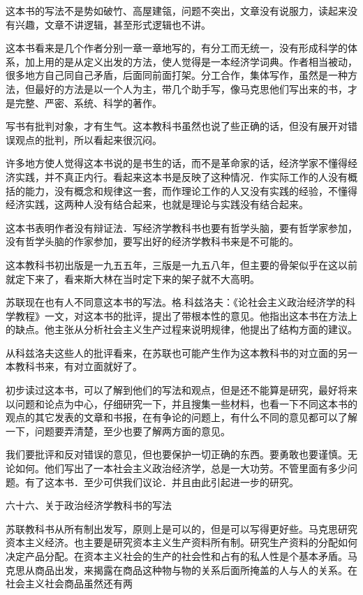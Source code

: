 这本书的写法不是势如破竹、高屋建瓴，问题不突出，文章没有说服力，读起来没有兴趣，文章不讲逻辑，甚至形式逻辑也不讲。

这本书看来是几个作者分别一章一章地写的，有分工而无统一，没有形成科学的体系，加上用的是从定义出发的方法，使人觉得是一本经济学词典。作者相当被动，很多地方自己同自己矛盾，后面同前面打架。分工合作，集体写作，虽然是一种方法，但最好的方法是以一个人为主，带几个助手写，像马克思他们写出来的书，才是完整、严密、系统、科学的著作。

写书有批判对象，才有生气。这本教科书虽然也说了些正确的话，但没有展开对错误观点的批判，所以看起来很沉闷。

许多地方使人觉得这本书说的是书生的话，而不是革命家的话，经济学家不懂得经济实践，并不真正内行。看起来这本书是反映了这种情况．作实际工作的人没有概括的能力，没有概念和规律这一套，而作理论工作的人又没有实践的经验，不懂得经济实践，这两种人没有结合起来，也就是理论与实践没有结合起来。

这本书表明作者没有辩证法．写经济学教科书也要有哲学头脑，要有哲学家参加，没有哲学头脑的作家参加，要写出好的经济学教科书来是不可能的。

这本教科书初出版是一九五五年，三版是一九五八年，但主要的骨架似乎在这以前就定下来了，看来斯大林在当时定下来的架子就不大高明。

苏联现在也有人不同意这本书的写法。格.科兹洛夫：《论社会主义政治经济学的科学教程》一文，对这本书的批评，提出了带根本性的意见。他指出这本书在方法上的缺点。他主张从分析社会主义生产过程来说明规律，他提出了结构方面的建议。

从科兹洛夫这些人的批评看来，在苏联也可能产生作为这本教科书的对立面的另一本教科书来，有对立面就好了。

初步读过这本书，可以了解到他们的写法和观点，但是还不能算是研究，最好将来以问题和论点为中心，仔细研究一下，并且搜集一些材料，也看一下不同这本书的观点的其它发表的文章和书报，在有争论的问题上，有什么不同的意见都可以了解一下，问题要弄清楚，至少也要了解两方面的意见。

我们要批评和反对错误的意见，但也要保护一切正确的东西。要勇敢也要谨慎。无论如何。他们写出了一本社会主义政治经济学，总是一大功劳。不管里面有多少问题。有了这本书．至少可供我们议论．并且由此引起进一步的研究。

六十六、关于政治经济学教科书的写法

苏联教科书从所有制出发写，原则上是可以的，但是可以写得更好些。马克思研究资本主义经济。也主要是研究资本主义生产资料所有制。研究生产资料的分配如何决定产品分配。在资本主义社会的生产的社会性和占有的私人性是个基本矛盾。马克思从商品出发，来揭露在商品这种物与物的关系后面所掩盖的人与人的关系。在社会主义社会商品虽然还有两

